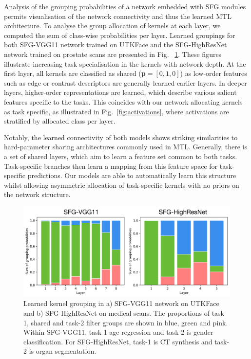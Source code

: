 Analysis of the grouping probabilities of a network embedded with SFG modules permits visualisation of the network connectivity and thus the learned MTL architecture. To analyse the group allocation of kernels at each layer, we computed the sum of class-wise probabilities per layer. Learned groupings for both SFG-VGG11 network trained on UTKFace and the SFG-HighResNet network trained on prostate scans are presented in Fig.~ \ref{fig:LEARNED_A}. These figures illustrate increasing task specialisation in the kernels with network depth. At the first layer, all kernels are classified as shared (\textbf{p}$=[0, 1, 0]$) as low-order features such as edge or contrast descriptors are generally learned earlier layers. In deeper layers, higher-order representations are learned, which describe various salient features specific to the tasks. This coincides with our network allocating kernels as task specific, as illustrated in Fig.~\ref{fig:activations}, where activations are stratified by allocated class per layer. %

Notably, the learned connectivity of both models shows striking similarities to hard-parameter sharing architectures commonly used in MTL. Generally, there is a set of shared layers, which aim to learn a feature set common to both tasks. Task-specific branches then learn a mapping from this feature space for task-specific predictions. Our models are able to automatically learn this structure whilst allowing asymmetric allocation of task-specific kernels with no priors on the network structure.

\begin{figure}[ht]
	\center
	\vspace{-3mm}
	\includegraphics[width=1.0\linewidth]{chapter_6/figures/learned_a.pdf}
	\caption{\small Learned kernel grouping in a) SFG-VGG11 network on UTKFace and b) SFG-HighResNet on medical scans. The proportions of task-1, shared and task-2 filter groups are shown in blue, green and pink. Within SFG-VGG11, task-1 age regression and task-2 is gender classification. For SFG-HighResNet, task-1 is CT synthesis and task-2 is organ segmentation. }
	\vspace{-3mm}
    \label{fig:LEARNED_A}
\end{figure}

